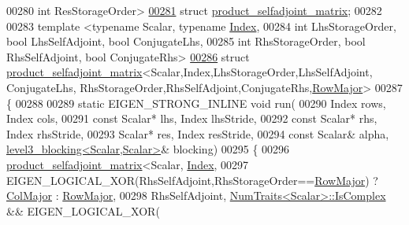 \begin{DoxyCode}
00280           \textcolor{keywordtype}{int} ResStorageOrder>
\hyperlink{struct_eigen_1_1internal_1_1product__selfadjoint__matrix}{00281} \textcolor{keyword}{struct }\hyperlink{struct_eigen_1_1internal_1_1product__selfadjoint__matrix}{product\_selfadjoint\_matrix};
00282 
00283 \textcolor{keyword}{template} <\textcolor{keyword}{typename} Scalar, \textcolor{keyword}{typename} \hyperlink{namespace_eigen_a62e77e0933482dafde8fe197d9a2cfde}{Index},
00284           \textcolor{keywordtype}{int} LhsStorageOrder, \textcolor{keywordtype}{bool} LhsSelfAdjoint, \textcolor{keywordtype}{bool} ConjugateLhs,
00285           \textcolor{keywordtype}{int} RhsStorageOrder, \textcolor{keywordtype}{bool} RhsSelfAdjoint, \textcolor{keywordtype}{bool} ConjugateRhs>
\hyperlink{struct_eigen_1_1internal_1_1product__selfadjoint__matrix_3_01_scalar_00_01_index_00_01_lhs_stora8fa4562df6c92574330a318a01a976cf}{00286} \textcolor{keyword}{struct }\hyperlink{struct_eigen_1_1internal_1_1product__selfadjoint__matrix}{product\_selfadjoint\_matrix}<Scalar,Index,LhsStorageOrder,LhsSelfAdjoint,
      ConjugateLhs, RhsStorageOrder,RhsSelfAdjoint,ConjugateRhs,\hyperlink{group__enums_ggaacded1a18ae58b0f554751f6cdf9eb13acfcde9cd8677c5f7caf6bd603666aae3}{RowMajor}>
00287 \{
00288 
00289   \textcolor{keyword}{static} EIGEN\_STRONG\_INLINE \textcolor{keywordtype}{void} run(
00290     Index rows, Index cols,
00291     \textcolor{keyword}{const} Scalar* lhs, Index lhsStride,
00292     \textcolor{keyword}{const} Scalar* rhs, Index rhsStride,
00293     Scalar* res,       Index resStride,
00294     \textcolor{keyword}{const} Scalar& alpha, \hyperlink{class_eigen_1_1internal_1_1level3__blocking}{level3\_blocking<Scalar,Scalar>}& blocking)
00295   \{
00296     \hyperlink{struct_eigen_1_1internal_1_1product__selfadjoint__matrix}{product\_selfadjoint\_matrix}<Scalar, \hyperlink{namespace_eigen_a62e77e0933482dafde8fe197d9a2cfde}{Index},
00297       EIGEN\_LOGICAL\_XOR(RhsSelfAdjoint,RhsStorageOrder==\hyperlink{group__enums_ggaacded1a18ae58b0f554751f6cdf9eb13acfcde9cd8677c5f7caf6bd603666aae3}{RowMajor}) ? 
      \hyperlink{group__enums_ggaacded1a18ae58b0f554751f6cdf9eb13a0cbd4bdd0abcfc0224c5fcb5e4f6669a}{ColMajor} : \hyperlink{group__enums_ggaacded1a18ae58b0f554751f6cdf9eb13acfcde9cd8677c5f7caf6bd603666aae3}{RowMajor},
00298       RhsSelfAdjoint, \hyperlink{group___core___module_struct_eigen_1_1_num_traits}{NumTraits<Scalar>::IsComplex} && EIGEN\_LOGICAL\_XOR(

\end{DoxyCode}
